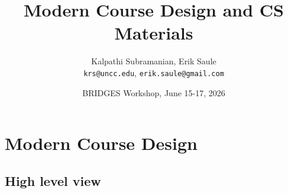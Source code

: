 \documentclass[aspectratio=169]{beamer}
\title{Modern Course Design and CS Materials}
\subtitle{}
\author{Kalpathi Subramanian, Erik Saule\\\texttt{krs@uncc.edu}, \texttt{erik.saule@gmail.com} }
\institute{The University of North Carolina at Charlotte}
\date{BRIDGES Workshop, June 15-17, 2026}
\begin{document}
\begin{frame}
\titlepage
\end{frame}




\section{Modern Course Design}

\subsection{High level view}
\end{document}
